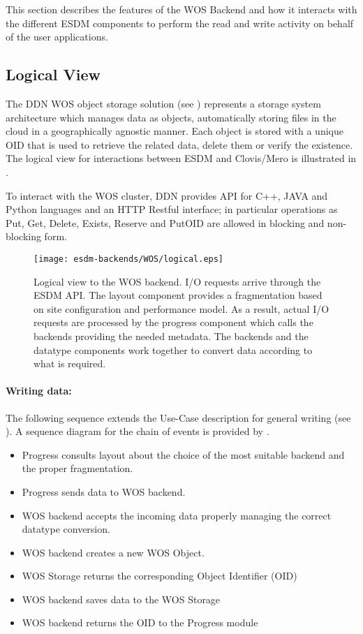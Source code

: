 
This section describes the features of the WOS Backend and how it interacts with the different ESDM components to perform the read and write activity on behalf of the user applications.

\subsection{Logical View}

The DDN WOS object storage solution (see ) represents a storage system architecture which manages data as objects, automatically storing files in the cloud in a geographically agnostic manner. Each object is stored with a unique OID that is used to retrieve the related data, delete them or verify the existence.
The logical view for interactions between ESDM and Clovis/Mero is illustrated in .

To interact with the WOS cluster, DDN provides API for C++, JAVA and Python languages and an HTTP Restful interface; in particular operations as Put, Get, Delete, Exists, Reserve and PutOID are allowed in blocking and non-blocking form.

\begin{figure}
	\centering
	\texttt{[image: esdm-backends/WOS/logical.eps]}
	\caption{Logical view to the WOS backend. I/O requests arrive through the ESDM API. The layout component provides a fragmentation based on site configuration and performance model. As a result, actual I/O requests are processed by the progress component which calls the backends providing the needed metadata. The backends and the datatype components work together to convert data according to what is required.}
	\label{fig:WOS backend logical view}
\end{figure}

\paragraph{Writing data:}
The following sequence extends the Use-Case description for general writing (see ).
A sequence diagram for the chain of events is provided by .

\begin{itemize}
	\item Progress consults layout about the choice of the most suitable backend and the proper fragmentation.
	\item Progress sends data to WOS backend.
	\item WOS backend accepts the incoming data properly managing the correct datatype conversion.
	\item WOS backend creates a new WOS Object.
	\item WOS Storage returns the corresponding Object Identifier (OID)
	\item WOS backend saves data to the WOS Storage
	\item WOS backend returns the OID to the Progress module
\end{itemize}

